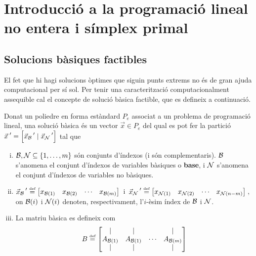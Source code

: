 \chapter[Introducció a la prog. lineal \& símplex primal]%
{Introducció a la programació lineal no entera i símplex primal}

\newcommand{\x}[1][]{{\vec{x}_{#1}\,}'}

\section{Solucions bàsiques factibles}

El fet que hi hagi solucions òptimes que siguin punts extrems no és de gran ajuda computacional per sí sol. Per tenir una caracterització computacionalment assequible cal el concepte de solució bàsica factible, que es defineix a continuació.

\begin{defi}
	Donat un poliedre en forma estàndard $P_e$ associat a un problema de programació lineal, una solució bàsica és un vector $\vec{x}\in P_e$ del qual es pot fer la partició $\x = \left[\x[\B]\mid\x[\N]\right]$ tal que
	\begin{enumerate}[i)]
		\item $\mathcal{B},\mathcal{N}\subseteq\{1,\ldots,m \}$ són conjunts d'índexos (i són complementaris). $\mathcal{B}$ s'anomena el conjunt d'índexos de variables bàsiques o \textbf{base}, i $\mathcal{N}$ s'anomena el conjunt d'índexos de variables no bàsiques.
		\item $\x[\B] \defeq 
		\begin{bmatrix}x_{\B(1)} & x_{\B(2)} & \cdots & x_{\B(m)}\end{bmatrix}\,$
		i
		$\,\x[\N] \defeq 
		\begin{bmatrix}x_{\N(1)} & x_{\N(2)} & \cdots & x_{\N(n-m)}\end{bmatrix}\,$, on $\mathcal{B}(i)$ i $\mathcal{N}(i)$ denoten, respectivament, l'$i$-èsim índex de $\mathcal{B}$ i $\mathcal{N}$.
		\item La matriu bàsica es defineix com 
		\[
			B \stackrel{\text{\tiny def}}{=}
			\begin{bmatrix}
			\arrowvert& 	\arrowvert& 	  & 	\arrowvert\\
			A_{\mathcal{B}(1)}&		A_{\mathcal{B}(1)}&	\cdots&		A_{\mathcal{B}(m)}\\
			\arrowvert& 	\arrowvert& 	  & 	\arrowvert\\
			\end{bmatrix}
		\]
	\end{enumerate}
\end{defi}

